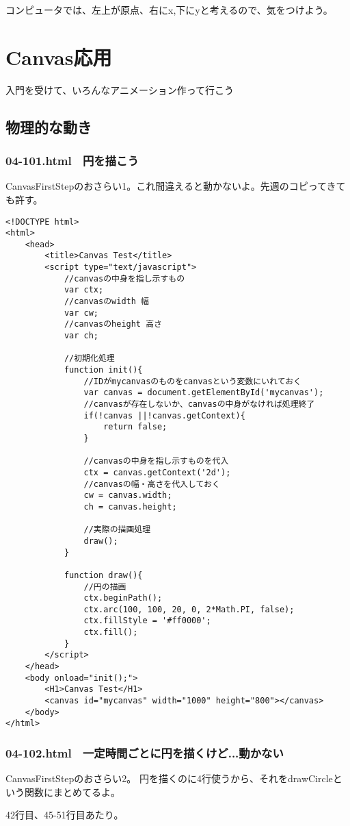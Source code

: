 \documentclass[mingoth,11pt,a4j,uplatex]{jsarticle}
\begin{document}
コンピュータでは、左上が原点、右にx,下にyと考えるので、気をつけよう。


\newpage
\section{Canvas応用}
入門を受けて、いろんなアニメーション作って行こう

\subsection{物理的な動き}
\subsubsection{04-101.html　円を描こう}
CanvasFirstStepのおさらい1。これ間違えると動かないよ。先週のコピってきても許す。
\begin{lstlisting}[caption=円を描こう]
<!DOCTYPE html>
<html>
	<head>
		<title>Canvas Test</title>
		<script type="text/javascript">
			//canvasの中身を指し示すもの
			var ctx;
			//canvasのwidth 幅
			var cw;
			//canvasのheight 高さ
			var ch;
			
			//初期化処理
			function init(){
				//IDがmycanvasのものをcanvasという変数にいれておく
				var canvas = document.getElementById('mycanvas');
				//canvasが存在しないか、canvasの中身がなければ処理終了
				if(!canvas ||!canvas.getContext){
					return false;
				}
				
				//canvasの中身を指し示すものを代入
				ctx = canvas.getContext('2d');
				//canvasの幅・高さを代入しておく
				cw = canvas.width;
				ch = canvas.height;
				
				//実際の描画処理
				draw();
			}
			
			function draw(){
				//円の描画
				ctx.beginPath();
				ctx.arc(100, 100, 20, 0, 2*Math.PI, false);
				ctx.fillStyle = '#ff0000';
				ctx.fill();
			}
		</script>
	</head>
	<body onload="init();">
		<H1>Canvas Test</H1>
		<canvas id="mycanvas" width="1000" height="800"></canvas>
	</body>
</html>
\end{lstlisting}

\subsubsection{04-102.html　一定時間ごとに円を描くけど...動かない}
CanvasFirstStepのおさらい2。
円を描くのに4行使うから、それをdrawCircleという関数にまとめてるよ。

42行目、45-51行目あたり。
\end{document}
